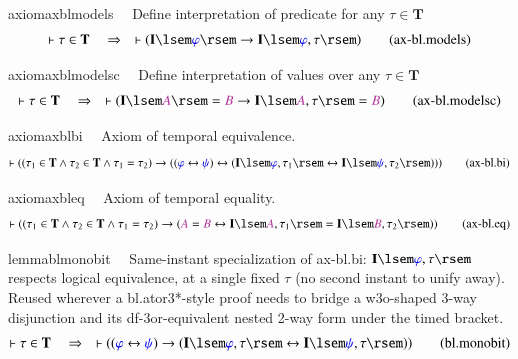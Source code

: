 \begin{restatable}{axiom}{axblmodels}~~ Define interpretation of predicate for
any $\tau \in \mathbf{T}$
\begin{align}
\vdash \tau \in \mathbf{T}\quad\Rightarrow\quad \vdash ( \mathbf{I} \lsem
    \mw{\varphi} \rsem \rightarrow \mathbf{I} \lsem \mw{\varphi} , \tau \rsem
    )\label{eq:ax-bl.models}\tag{ax-bl.models}
\end{align}
\end{restatable}

\begin{restatable}{axiom}{axblmodelsc}~~ Define interpretation of values over
any $\tau \in \mathbf{T}$
\begin{align}
\vdash \tau \in \mathbf{T}\quad\Rightarrow\quad \vdash ( \mathbf{I} \lsem
    \mc{A} \rsem = \mc{B} \rightarrow \mathbf{I} \lsem \mc{A} , \tau \rsem =
    \mc{B} )\label{eq:ax-bl.modelsc}\tag{ax-bl.modelsc}
\end{align}
\end{restatable}

\begin{restatable}{axiom}{axblbi}~~ Axiom of temporal equivalence.
\begin{align}
\vdash ( ( \tau_1 \in \mathbf{T} \wedge \tau_2 \in \mathbf{T} \wedge \tau_1 =
    \tau_2 ) \rightarrow ( ( \mw{\varphi} \leftrightarrow \mw{\psi} )
    \leftrightarrow ( \mathbf{I} \lsem \mw{\varphi} , \tau_1 \rsem
    \leftrightarrow \mathbf{I} \lsem \mw{\psi} , \tau_2 \rsem ) )
    )\label{eq:ax-bl.bi}\tag{ax-bl.bi}
\end{align}
\end{restatable}

\begin{restatable}{axiom}{axbleq}~~ Axiom of temporal equality.
\begin{align}
\vdash ( ( \tau_1 \in \mathbf{T} \wedge \tau_2 \in \mathbf{T} \wedge \tau_1 =
    \tau_2 ) \rightarrow ( \mc{A} = \mc{B} \leftrightarrow \mathbf{I} \lsem
    \mc{A} , \tau_1 \rsem = \mathbf{I} \lsem \mc{B} , \tau_2 \rsem )
    )\label{eq:ax-bl.eq}\tag{ax-bl.eq}
\end{align}
\end{restatable}

\begin{restatable}{lemma}{blmonobit}~~ Same-instant specialization of ax-bl.bi:
$\mathbf{I}\lsem\mw{\varphi},\tau\rsem$ respects logical equivalence, at a single fixed $\tau$ (no
second instant to unify away).  Reused wherever a bl.ator3*-style proof
needs to bridge a w3o-shaped 3-way disjunction and its df-3or-equivalent
nested 2-way form under the timed bracket.
\begin{align}
\vdash \tau \in \mathbf{T}\quad\Rightarrow\quad \vdash ( ( \mw{\varphi}
    \leftrightarrow \mw{\psi} ) \rightarrow ( \mathbf{I} \lsem \mw{\varphi} ,
    \tau \rsem \leftrightarrow \mathbf{I} \lsem \mw{\psi} , \tau \rsem )
    )\label{eq:bl.monobit}\tag{bl.monobit}
\end{align}
\end{restatable}


